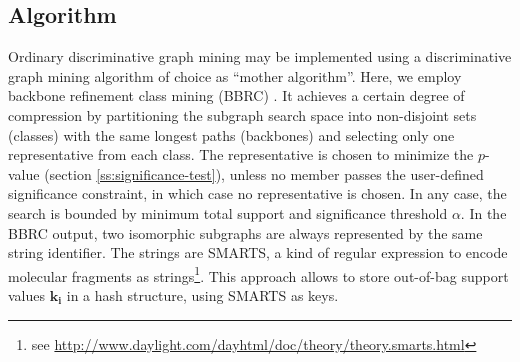\documentclass{sig-alternate}
\begin{document}
\subsection{Algorithm}
\label{s:Algorithm}
Ordinary discriminative graph mining may be 
implemented using a discriminative graph mining algorithm of choice as ``mother algorithm''. Here, we
employ backbone refinement class mining (BBRC) \cite{maunz11efficient}. It
achieves a certain degree of compression by partitioning the subgraph search space into non-disjoint sets (classes) with the same
longest paths (backbones) and selecting only one representative from each
class. 
The representative is chosen to minimize the $p$-value (section \ref{ss:significance-test}), unless no member passes the user-defined significance constraint, in which case no representative is chosen.
In any case, the search is bounded by minimum total support and significance threshold $\alpha$.
In the BBRC output, two isomorphic subgraphs are always represented by the same string identifier.
The strings are SMARTS, a kind of regular expression to encode
molecular fragments as strings\footnote{see \url{http://www.daylight.com/dayhtml/doc/theory/theory.smarts.html}}. This approach allows to store out-of-bag support values $\mathbf{k_i}$ in a
hash structure, using SMARTS as keys. 
\end{document}
